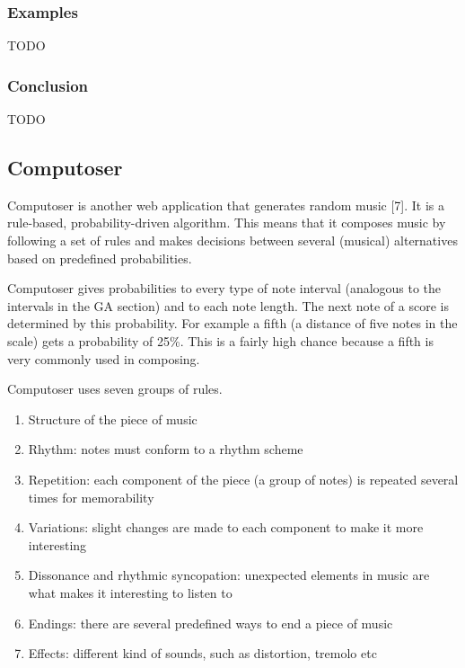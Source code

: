 \documentclass[12pt]{article}
\begin{document}
\subsubsection{Examples}

TODO

\subsubsection{Conclusion}

TODO

\subsection{Computoser}

Computoser is another web application that generates random music [7]. It is a rule-based, probability-driven algorithm. This means that it composes music by following a set of rules and makes decisions between several (musical) alternatives based on predefined probabilities.
\newline

Computoser gives probabilities to every type of note interval (analogous to the intervals in the GA section) and to each note length. The next note of a score is determined by this probability.
For example a fifth (a distance of five notes in the scale) gets a probability of 25\%. This is a fairly high chance because a fifth is very commonly used in composing.
\newline

Computoser uses seven groups of rules.
\begin{enumerate}
\item Structure of the piece of music 
\item Rhythm: notes must conform to a rhythm scheme
\item Repetition: each component of the piece (a group of notes) is repeated several times for memorability 
\item Variations: slight changes are made to each component to make it more interesting
\item Dissonance and rhythmic syncopation: unexpected elements in music are what makes it interesting to listen to
\item Endings: there are several predefined ways to end a piece of music
\item Effects: different kind of sounds, such as distortion, tremolo etc
\end{enumerate}
\end{document}
